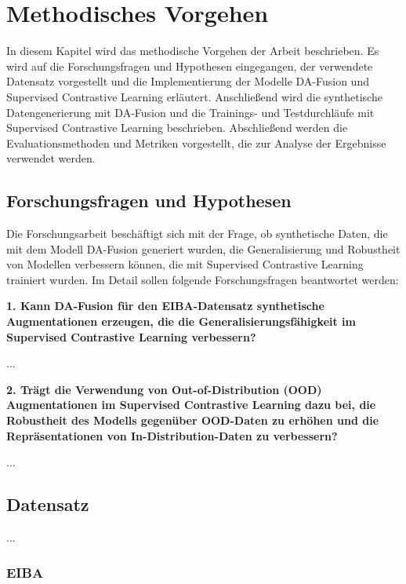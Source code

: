 \chapter{Methodisches Vorgehen}

In diesem Kapitel wird das methodische Vorgehen der Arbeit beschrieben. Es wird auf die Forschungsfragen und Hypothesen eingegangen, der verwendete Datensatz vorgestellt und die Implementierung der Modelle DA-Fusion und Supervised Contrastive Learning erläutert. Anschließend wird die synthetische Datengenerierung mit DA-Fusion und die Trainings- und Testdurchläufe mit Supervised Contrastive Learning beschrieben. Abschließend werden die Evaluationsmethoden und Metriken vorgestellt, die zur Analyse der Ergebnisse verwendet werden.

\section{Forschungsfragen und Hypothesen}

Die Forschungsarbeit beschäftigt sich mit der Frage, ob synthetische Daten, die mit dem Modell DA-Fusion generiert wurden, die Generalisierung und Robustheit von Modellen verbessern können, die mit Supervised Contrastive Learning trainiert wurden. Im Detail sollen folgende Forschungsfragen beantwortet werden:

\textbf{1. Kann DA-Fusion für den EIBA-Datensatz synthetische Augmentationen erzeugen, die die Generalisierungsfähigkeit im Supervised Contrastive Learning verbessern?}


...

\textbf{2. Trägt die Verwendung von Out-of-Distribution (OOD) Augmentationen im Supervised Contrastive Learning dazu bei, die Robustheit des Modells gegenüber OOD-Daten zu erhöhen und die Repräsentationen von In-Distribution-Daten zu verbessern?}


...

\section{Datensatz}

...

\subsection{EIBA}

